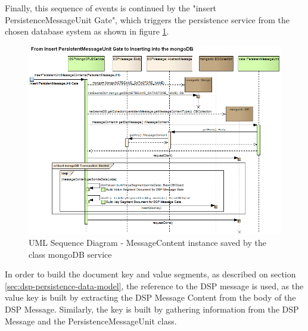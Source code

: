 Finally, this sequence of events is continued by the "insert
PersistenceMessageUnit Gate", which triggers the persistence service from the
chosen database system as shown in figure
\ref{fig:From-Insert-PersistentMessageUnit-to-mongoDB}.

\begin{figure}[!b]
  \centering
  \includegraphics[scale=0.5]{../diagrams/From-Insert-PersistentMessageUnit-to-mongoDB}
  \caption{UML Sequence Diagram - MessageContent instance saved by the class
  mongoDB service}
  \label{fig:From-Insert-PersistentMessageUnit-to-mongoDB}
\end{figure}

In order to build the document key and value segments, as described on section
\ref{sec:dsp-persistence-data-model}, the reference to the DSP message is
used, as the value key is built by extracting the DSP Message Content from the
body of the DSP Message. Similarly, the key is built by gathering information
from the DSP Message and the PersistenceMessageUnit class.

